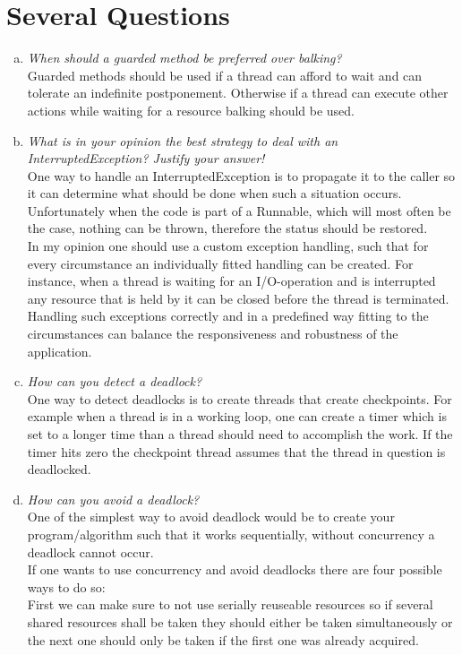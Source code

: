 \documentclass{report}
\author{Marcel \textsc{Zauder} 16-124-836 \\
	Pascal \textsc{Gerig} 16-104-721}
\begin{document}
	\section{Several Questions}
	\startsection
		\begin{enumerate}[a)]
			\item \textit{When should a guarded method be preferred over balking?} \\
			Guarded methods should be used if a thread can afford to wait and can tolerate an indefinite postponement. Otherwise if a thread can execute other actions while waiting for a resource balking should be used.
			\item \textit{What is in your opinion the best strategy to deal with an InterruptedException? Justify your answer!} \\
			One way to handle an InterruptedException is to propagate it to the caller so it can determine what should be done when such a situation occurs. Unfortunately when the code is part of a Runnable, which will most often be the case, nothing can be thrown, therefore the status should be restored. \\
			In my opinion one should use a custom exception handling, such that for every circumstance an individually fitted handling can be created. For instance, when a thread is waiting for an I/O-operation and is interrupted any resource that is held by it can be closed before the thread is terminated. Handling such exceptions correctly and in a predefined way fitting to the circumstances can balance the responsiveness and robustness of the application.
			\item \textit{How can you detect a deadlock?} \\
			One way to detect deadlocks is to create threads that create checkpoints. For example when a thread is in a working loop, one can create a timer which is set to a longer time than a thread should need to accomplish the work. If the timer hits zero the checkpoint thread assumes that the thread in question is deadlocked.
			\item \textit{How can you avoid a deadlock?} \\
			One of the simplest way to avoid deadlock would be to create your program/algorithm such that it works sequentially, without concurrency a deadlock cannot occur. \\
			If one wants to use concurrency and avoid deadlocks there are four possible ways to do so: \\
			First we can make sure to not use serially reuseable resources so if several shared resources shall be taken they should either be taken simultaneously or the next one should only be taken if the first one was already acquired. \\

\end{enumerate}
\end{document}
